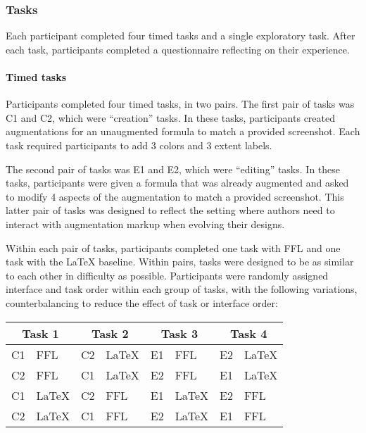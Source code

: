 \subsubsection{Tasks}
Each participant completed four timed tasks and a single exploratory task. After each task, participants completed a questionnaire reflecting on their experience.

\paragraph{Timed tasks}
Participants completed four timed tasks, in two pairs. The first pair of tasks was C1 and C2, which were ``creation'' tasks. In these tasks, participants created augmentations for an unaugmented formula to match a provided screenshot. Each task required participants to add 3 colors and 3 extent labels. 

The second pair of tasks was E1 and E2, which were ``editing'' tasks. In these tasks, participants were given a formula that was already augmented and asked to modify 4 aspects of the augmentation to match a provided screenshot. This latter pair of tasks was designed to reflect the setting where authors need to interact with augmentation markup when evolving their designs.

Within each pair of tasks, participants completed one task with FFL and one task with the LaTeX baseline. Within pairs, tasks were designed to be as similar to each other in difficulty as possible. Participants were randomly assigned interface and task order within each group of tasks, with the following variations, counterbalancing to reduce the effect of task or interface order:

\begin{center}
    \begin{tabular}{r l|r l|r l|r l}
         \multicolumn{2}{c|}{Task 1} & \multicolumn{2}{c|}{Task 2} & \multicolumn{2}{c|}{Task 3} & \multicolumn{2}{c}{Task 4}\\\hline
         C1 &FFL   & C2 &LaTeX & E1 &FFL   & E2 &LaTeX \\
         C2 &FFL   & C1 &LaTeX & E2 &FFL   & E1 &LaTeX \\
         C1 &LaTeX & C2 &FFL   & E1 &LaTeX & E2 & FFL \\
         C2 &LaTeX & C1 &FFL   & E2 &LaTeX & E1 & FFL \\
    \end{tabular}
\end{center}

